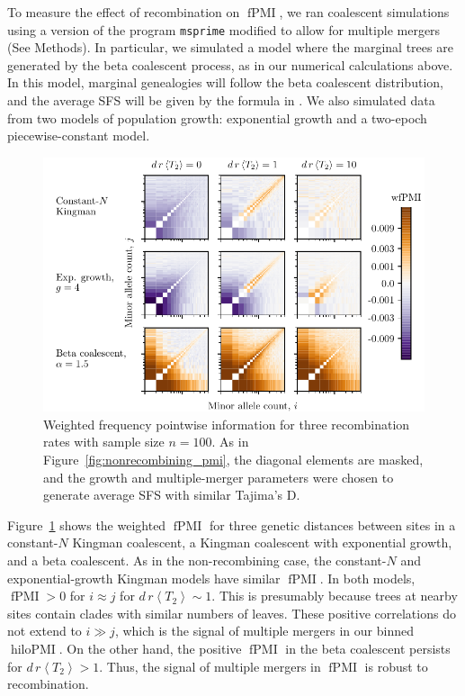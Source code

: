 \documentclass[11pt, letterpaper]{article}   	%
\newcommand{\Fig}[1]{Figure~\ref{#1}}
\newcommand{\E}[1]{\left< #1 \right>}
\DeclareMathOperator{\fpmi}{fPMI}
\DeclareMathOperator{\hilopmi}{hiloPMI}
\begin{document}
To measure the effect of recombination on $\fpmi$, we ran coalescent simulations using a version of the program \texttt{msprime} \autocite{KelleherEtAl2016} modified to allow for multiple mergers (See Methods).
In particular, we simulated a model where the marginal trees are generated by the beta coalescent process, as in our numerical calculations above.
In this model, marginal genealogies will follow the beta coalescent distribution, and the average SFS will be given by the formula in \cite{BirknerEtAl2013}.
We also simulated data from two models of population growth: exponential growth and a two-epoch piecewise-constant model.

\begin{figure}
\centering
\includegraphics[scale=1]{figures/wfpmi_with_recombination.pdf}
\caption{Weighted frequency pointwise information for three recombination rates with sample size $n=100$. As in \Fig{fig:nonrecombining_pmi}, the diagonal elements are masked, and the growth and multiple-merger parameters were chosen to generate average SFS with similar Tajima's D. \label{fig:wfpmi_recombination}}
\end{figure}

\Fig{fig:wfpmi_recombination} shows the weighted $\fpmi$ for three genetic distances between sites in a constant-$N$ Kingman coalescent, a Kingman coalescent with exponential growth, and a beta coalescent.
As in the non-recombining case, the constant-$N$ and exponential-growth Kingman models have similar $\fpmi$.
In both models, $\fpmi > 0$ for $i\approx j$ for $d\,r \E{T_2} \sim 1$.
This is presumably because trees at nearby sites contain clades with similar numbers of leaves.
These positive correlations do not extend to $i \gg j$, which is the signal of multiple mergers in our binned $\hilopmi$.
On the other hand, the positive $\fpmi$ in the beta coalescent persists for $d\,r \E{T_2} > 1$.
Thus, the signal of multiple mergers in $\fpmi$ is robust to recombination.
\end{document}
